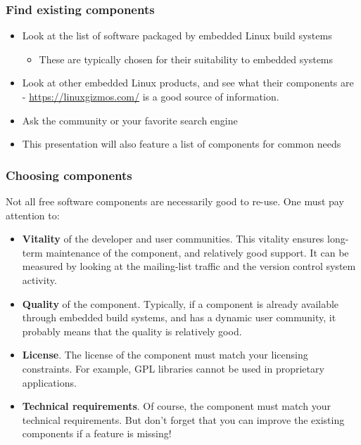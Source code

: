\begin{frame}
  \frametitle{Find existing components}
  \begin{itemize}
  \item Look at the list of software packaged by embedded Linux build
    systems
    \begin{itemize}
    \item These are typically chosen for their suitability to embedded
      systems
    \end{itemize}
  \item Look at other embedded Linux products, and see what their
    components are - \url{https://linuxgizmos.com/} is a good source
    of information.
  \item Ask the community or your favorite search engine
  \item This presentation will also feature a list of components for
    common needs
  \end{itemize}
\end{frame}

\begin{frame}
  \frametitle{Choosing components}
  Not all free software components are necessarily good to
  re-use. One must pay attention to:
  \begin{itemize}
  \item {\bf Vitality} of the developer and user communities. This
    vitality ensures long-term maintenance of the component, and
    relatively good support. It can be measured by looking at the
    mailing-list traffic and the version control system activity.
  \item {\bf Quality} of the component. Typically, if a component is
    already available through embedded build systems, and has a
    dynamic user community, it probably means that the quality is
    relatively good.
  \item {\bf License}. The license of the component must match your
    licensing constraints. For example, GPL libraries cannot be used
    in proprietary applications.
  \item {\bf Technical requirements}. Of course, the component must
    match your technical requirements. But don't forget that you can
    improve the existing components if a feature is missing!
  \end{itemize}
\end{frame}

